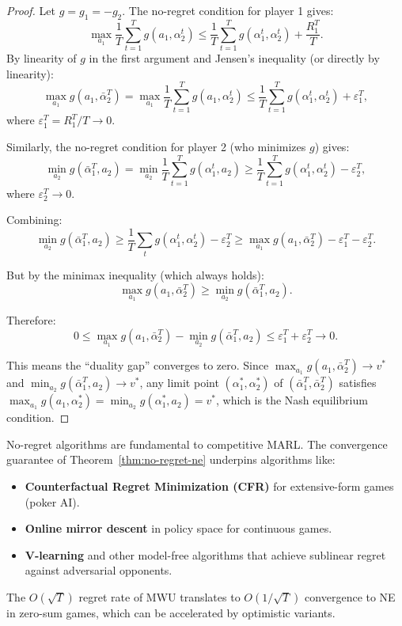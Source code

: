 \documentclass[11pt,a4paper]{article}
\theoremstyle{definition}
\theoremstyle{plain}
\theoremstyle{remark}
\begin{document}
\begin{proof}
Let $g = g_1 = -g_2$. The no-regret condition for player 1 gives:
\[
    \max_{a_1} \frac{1}{T} \sum_{t=1}^T g(a_1, \alpha_2^t)
    \leq \frac{1}{T} \sum_{t=1}^T g(\alpha_1^t, \alpha_2^t) + \frac{R_1^T}{T}.
\]
By linearity of $g$ in the first argument and Jensen's inequality (or directly by linearity):
\[
    \max_{a_1} g(a_1, \bar{\alpha}_2^T)
    = \max_{a_1} \frac{1}{T} \sum_{t=1}^T g(a_1, \alpha_2^t)
    \leq \frac{1}{T} \sum_{t=1}^T g(\alpha_1^t, \alpha_2^t) + \varepsilon_1^T,
\]
where $\varepsilon_1^T = R_1^T / T \to 0$.

Similarly, the no-regret condition for player 2 (who minimizes $g$) gives:
\[
    \min_{a_2} g(\bar{\alpha}_1^T, a_2)
    = \min_{a_2} \frac{1}{T} \sum_{t=1}^T g(\alpha_1^t, a_2)
    \geq \frac{1}{T} \sum_{t=1}^T g(\alpha_1^t, \alpha_2^t) - \varepsilon_2^T,
\]
where $\varepsilon_2^T \to 0$.

Combining:
\[
    \min_{a_2} g(\bar{\alpha}_1^T, a_2)
    \geq \frac{1}{T}\sum_t g(\alpha_1^t, \alpha_2^t) - \varepsilon_2^T
    \geq \max_{a_1} g(a_1, \bar{\alpha}_2^T) - \varepsilon_1^T - \varepsilon_2^T.
\]

But by the minimax inequality (which always holds):
\[
    \max_{a_1} g(a_1, \bar{\alpha}_2^T)
    \geq \min_{a_2} g(\bar{\alpha}_1^T, a_2).
\]

Therefore:
\[
    0 \leq \max_{a_1} g(a_1, \bar{\alpha}_2^T) - \min_{a_2} g(\bar{\alpha}_1^T, a_2)
    \leq \varepsilon_1^T + \varepsilon_2^T \to 0.
\]

This means the ``duality gap'' converges to zero. Since
$\max_{a_1} g(a_1, \bar{\alpha}_2^T) \to v^*$ and
$\min_{a_2} g(\bar{\alpha}_1^T, a_2) \to v^*$, any limit point
$(\alpha_1^*, \alpha_2^*)$ of $(\bar{\alpha}_1^T, \bar{\alpha}_2^T)$ satisfies
$\max_{a_1} g(a_1, \alpha_2^*) = \min_{a_2} g(\alpha_1^*, a_2) = v^*$, which is the
Nash equilibrium condition.
\end{proof}

\begin{rlconnection}
No-regret algorithms are fundamental to competitive MARL. The convergence guarantee of
Theorem~\ref{thm:no-regret-ne} underpins algorithms like:
\begin{itemize}
    \item \textbf{Counterfactual Regret Minimization (CFR)} for extensive-form games
    (poker AI).
    \item \textbf{Online mirror descent} in policy space for continuous games.
    \item \textbf{V-learning} and other model-free algorithms that achieve sublinear regret
    against adversarial opponents.
\end{itemize}
The $O(\sqrt{T})$ regret rate of MWU translates to $O(1/\sqrt{T})$ convergence to NE in
zero-sum games, which can be accelerated by optimistic variants.
\end{rlconnection}
\end{document}
